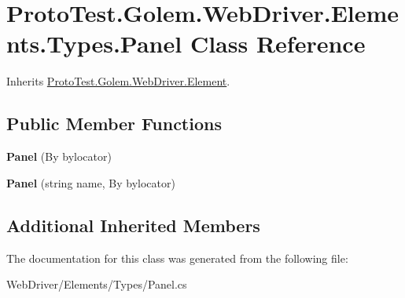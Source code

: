 \hypertarget{class_proto_test_1_1_golem_1_1_web_driver_1_1_elements_1_1_types_1_1_panel}{\section{Proto\-Test.\-Golem.\-Web\-Driver.\-Elements.\-Types.\-Panel Class Reference}
\label{class_proto_test_1_1_golem_1_1_web_driver_1_1_elements_1_1_types_1_1_panel}
}


Inherits \hyperlink{class_proto_test_1_1_golem_1_1_web_driver_1_1_element}{Proto\-Test.\-Golem.\-Web\-Driver.\-Element}.

\subsection*{Public Member Functions}
\begin{DoxyCompactItemize}
\item 
\hypertarget{class_proto_test_1_1_golem_1_1_web_driver_1_1_elements_1_1_types_1_1_panel_a44677ed08cc357d282d7afd1f6928942}{{\bfseries Panel} (By bylocator)}\label{class_proto_test_1_1_golem_1_1_web_driver_1_1_elements_1_1_types_1_1_panel_a44677ed08cc357d282d7afd1f6928942}

\item 
\hypertarget{class_proto_test_1_1_golem_1_1_web_driver_1_1_elements_1_1_types_1_1_panel_a3802f720156c99ec630d689bbfe3713b}{{\bfseries Panel} (string name, By bylocator)}\label{class_proto_test_1_1_golem_1_1_web_driver_1_1_elements_1_1_types_1_1_panel_a3802f720156c99ec630d689bbfe3713b}

\end{DoxyCompactItemize}
\subsection*{Additional Inherited Members}


The documentation for this class was generated from the following file\-:\begin{DoxyCompactItemize}
\item 
Web\-Driver/\-Elements/\-Types/Panel.\-cs\end{DoxyCompactItemize}
